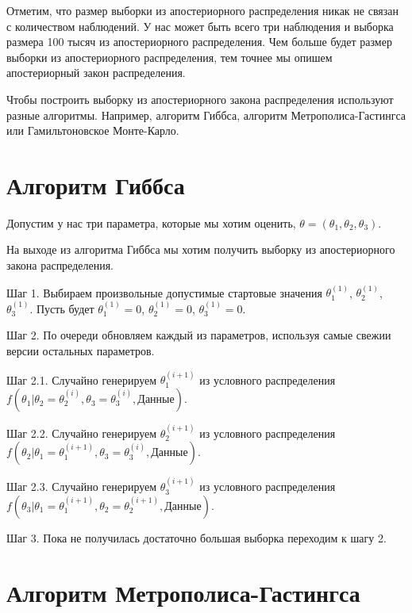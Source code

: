 \documentclass[11pt,russian,]{article}
\begin{document}
Отметим, что размер выборки из апостериорного распределения никак не
связан с количеством наблюдений. У нас может быть всего три наблюдения и
выборка размера 100 тысяч из апостериорного распределения. Чем больше
будет размер выборки из апостериорного распределения, тем точнее мы
опишем апостериорный закон распределения.

Чтобы построить выборку из апостериорного закона распределения
используют разные алгоритмы. Например, алгоритм Гиббса, алгоритм
Метрополиса-Гастингса или Гамильтоновское Монте-Карло.

\section{Алгоритм Гиббса}\label{-}

Допустим у нас три параметра, которые мы хотим оценить,
\(\theta = (\theta_1, \theta_2, \theta_3)\).

На выходе из алгоритма Гиббса мы хотим получить выборку из
апостериорного закона распределения.

Шаг 1. Выбираем произвольные допустимые стартовые значения
\(\theta_1^{(1)}\), \(\theta_2^{(1)}\), \(\theta_3^{(1)}\). Пусть будет
\(\theta_1^{(1)} = 0\), \(\theta_2^{(1)} = 0\), \(\theta_3^{(1)}=0\).

Шаг 2. По очереди обновляем каждый из параметров, используя самые свежии
версии остальных параметров.

Шаг 2.1. Случайно генерируем \(\theta_1^{(i+1)}\) из условного
распределения
\(f(\theta_1|\theta_2 = \theta_2^{(i)}, \theta_3 = \theta_3^{(i)}, \text{Данные})\).

Шаг 2.2. Случайно генерируем \(\theta_2^{(i+1)}\) из условного
распределения
\(f(\theta_2|\theta_1 = \theta_1^{(i+1)}, \theta_3 = \theta_3^{(i)}, \text{Данные})\).

Шаг 2.3. Случайно генерируем \(\theta_3^{(i+1)}\) из условного
распределения
\(f(\theta_3|\theta_1 = \theta_1^{(i+1)}, \theta_2 = \theta_2^{(i+1)}, \text{Данные})\).

Шаг 3. Пока не получилась достаточно большая выборка переходим к шагу 2.

\section{Алгоритм Метрополиса-Гастингса}\label{--}
\end{document}
